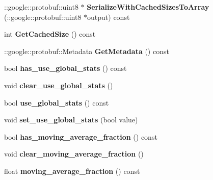 \begin{DoxyCompactItemize}
\+::google\+::protobuf\+::uint8 $\ast$ {\bfseries Serialize\+With\+Cached\+Sizes\+To\+Array} (\+::google\+::protobuf\+::uint8 $\ast$output) const
\item 
\mbox{\label{classcaffe_1_1_batch_norm_parameter_a76aeb912a1e33e15869660bb76fedefb}} 
int {\bfseries Get\+Cached\+Size} () const
\item 
\mbox{\label{classcaffe_1_1_batch_norm_parameter_a8090171aaefca630fd96bcc5141b7576}} 
\+::google\+::protobuf\+::\+Metadata {\bfseries Get\+Metadata} () const
\item 
\mbox{\label{classcaffe_1_1_batch_norm_parameter_a4f9c27934a988c30718f3d03a95d2178}} 
bool {\bfseries has\+\_\+use\+\_\+global\+\_\+stats} () const
\item 
\mbox{\label{classcaffe_1_1_batch_norm_parameter_a2b810cf45bdb5c28a077cc94c9becbdd}} 
void {\bfseries clear\+\_\+use\+\_\+global\+\_\+stats} ()
\item 
\mbox{\label{classcaffe_1_1_batch_norm_parameter_a314c449e97b53a2e492c3c359407e189}} 
bool {\bfseries use\+\_\+global\+\_\+stats} () const
\item 
\mbox{\label{classcaffe_1_1_batch_norm_parameter_aa599ca8b981624638d44d34cbc9d29a8}} 
void {\bfseries set\+\_\+use\+\_\+global\+\_\+stats} (bool value)
\item 
\mbox{\label{classcaffe_1_1_batch_norm_parameter_a5e14cd709d4abb5c44598108dcf7a735}} 
bool {\bfseries has\+\_\+moving\+\_\+average\+\_\+fraction} () const
\item 
\mbox{\label{classcaffe_1_1_batch_norm_parameter_a91b384d668d9906f8da908e19731c0ed}} 
void {\bfseries clear\+\_\+moving\+\_\+average\+\_\+fraction} ()
\item 
\mbox{\label{classcaffe_1_1_batch_norm_parameter_a5963141535149e128d497894c16c2184}} 
float {\bfseries moving\+\_\+average\+\_\+fraction} () const

\end{DoxyCompactItemize}

